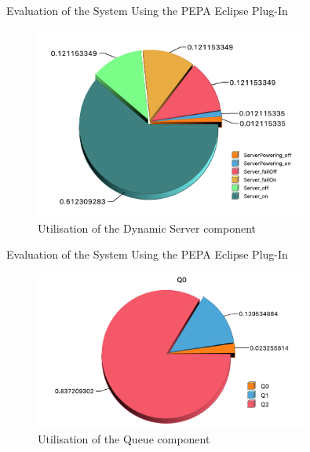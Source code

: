 \documentclass[8pt]{beamer}
\begin{document}
    \begin{frame}{Evaluation of the System Using the PEPA Eclipse Plug-In}
        \begin{figure}[h]
            \centering
            \includegraphics[width=0.8\textwidth]{Images/utilization-dynamic-server.png}
            \caption{Utilisation of the Dynamic Server component}
            \label{fig:utilization-dynamic-server}
        \end{figure}
    \end{frame}

    \begin{frame}{Evaluation of the System Using the PEPA Eclipse Plug-In}
        \begin{figure}[h]
            \centering
            \includegraphics[width=0.8\textwidth]{Images/utilization-queue.png}
            \caption{Utilisation of the Queue component}
            \label{fig:utilization-queue}
        \end{figure}
    \end{frame}
\end{document}
